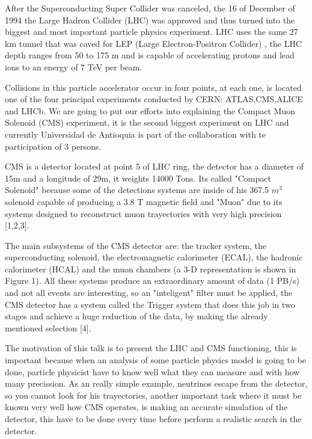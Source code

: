 \documentclass[a4paper,11pt]{article}
\newcommand{\abstracttext}[1]{
 \vspace*{-0.3cm}
 \columnsep0.75cm
 \begin{multicols}{2} #1 \end{multicols}
}
\begin{document}
\abstracttext{ After the Superconducting Super Collider was canceled, the 16 of December of 1994 the Large Hadron Collider (LHC) was approved and thus turned into the biggest and most important particle physics experiment. LHC uses the same 27 km tunnel that was caved for LEP (Large Electron-Positron Collider) , the LHC depth ranges from 50 to 175 m and is capable of accelerating protons and lead ions to an energy of 7 TeV per beam.
	
Collisions in this particle accelerator occur in four points, at each one, is located one of the four principal experiments conducted by CERN: ATLAS,CMS,ALICE and LHCb. We are going to put our efforts into explaining the Compact Muon Solenoid (CMS) experiment, it is the second biggest experiment on LHC and currently Universidad de Antioquia is part of the collaboration with te participation of 3 persons.

CMS is a detector located at point 5 of LHC ring, the detector has a diameter of 15m and a longitude of 29m, it weights 14000 Tons. Its called "Compact Solenoid" because some of the detections systems are inside of his 367.5 $m^3$ solenoid capable of producing a 3.8 T magnetic field and "Muon" due to its systems designed to reconstruct muon trayectories with very high precision [1,2,3].

The main subsystems of the CMS detector are: the tracker system, the superconducting solenoid, the electromagnetic calorimeter (ECAL), the hadronic calorimeter (HCAL) and the muon chambers (a 3-D representation is shown in Figure 1). All these systems produce an extraordinary amount of data (1 PB/s) and not all events are interesting, so an "inteligent" filter must be applied, the CMS detector has a system called the Trigger system that does this job in two stages and achieve a huge reduction of the data, by making the already mentioned selection [4].

The motivation of this talk is to present the LHC and CMS functioning, this is important because when an analysis of some particle physics model is going to be done, particle physicist have to know well what they can measure and with how many precission. As an really simple example, neutrinos escape from the detector, so you cannot look for his trayectories, another important task where it must be known very well how CMS operates, is making an accurate simulation of the detector, this have to be done every time before perform a realistic search in the detector.








}
\end{document}
